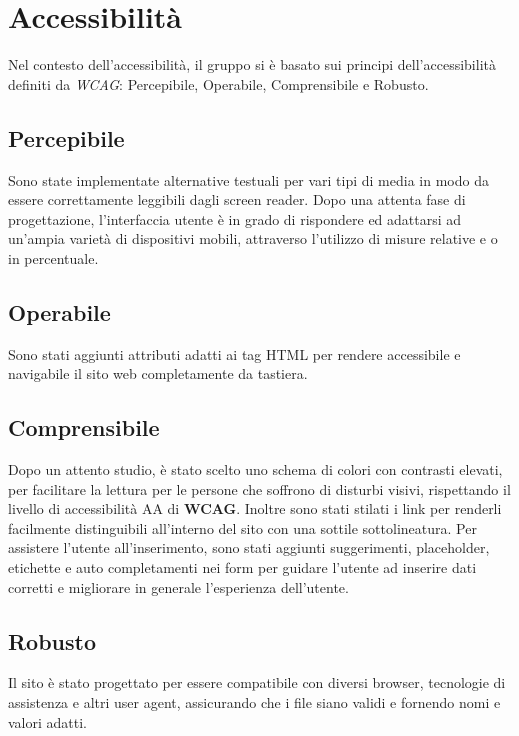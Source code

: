 \documentclass[11pt]{article}
\begin{document}
\section{Accessibilità}
\label{sec:orgac4dc22}
Nel contesto dell'accessibilità, il gruppo si è basato sui principi dell'accessibilità definiti da \emph{WCAG}: Percepibile, Operabile, Comprensibile e Robusto.
\subsection{Percepibile}
\label{sec:org5299509}
Sono state implementate alternative testuali per vari tipi di media in modo da essere correttamente leggibili dagli screen reader. Dopo una attenta fase di progettazione, l'interfaccia utente è in grado di rispondere ed adattarsi ad un'ampia varietà di dispositivi mobili, attraverso l'utilizzo di misure relative e o in percentuale.
\subsection{Operabile}
\label{sec:org10659d9}
Sono stati aggiunti attributi adatti ai tag HTML per rendere accessibile e navigabile il sito web completamente da tastiera.
\subsection{Comprensibile}
\label{sec:orge222719}
Dopo un attento studio, è stato scelto uno schema di colori con contrasti elevati, per facilitare la lettura per le persone che soffrono di disturbi visivi, rispettando il livello di accessibilità AA di \textbf{WCAG}. Inoltre sono stati stilati i link per renderli facilmente distinguibili all'interno del sito con una sottile sottolineatura. Per assistere l'utente all'inserimento, sono stati aggiunti suggerimenti, placeholder, etichette e auto completamenti nei form per guidare l'utente ad inserire dati corretti e migliorare in generale l'esperienza dell'utente.
\subsection{Robusto}
\label{sec:orgc573b59}
Il sito è stato progettato per essere compatibile con diversi browser, tecnologie di assistenza e altri user agent, assicurando che i file siano validi e fornendo nomi e valori adatti.
\end{document}
